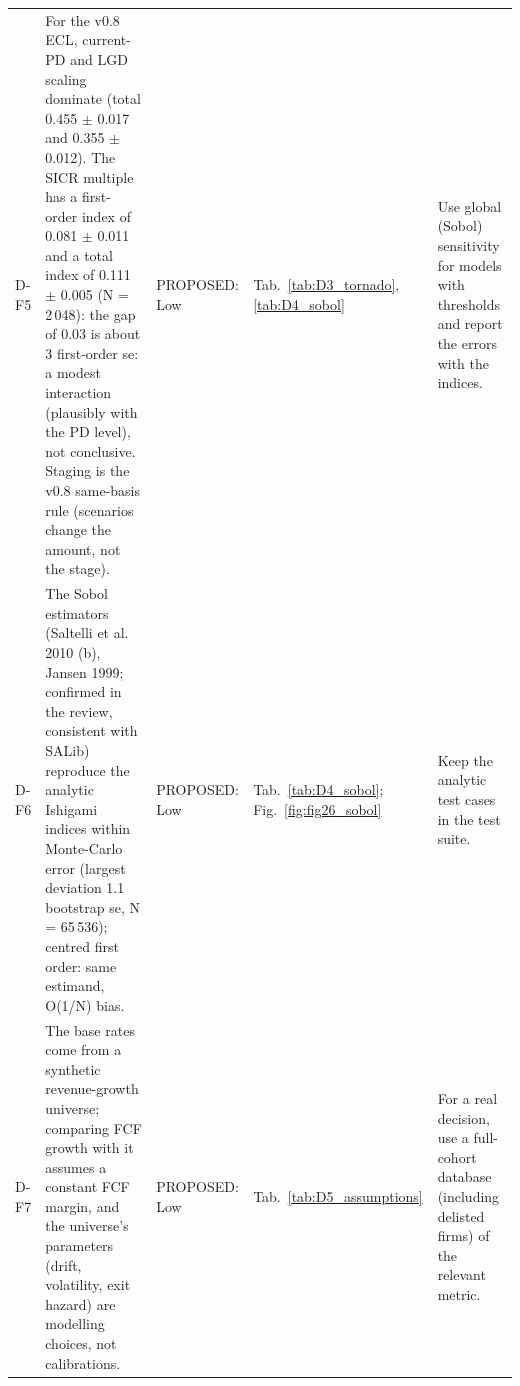 \begin{table}[H]
\begin{tabular}{>{\raggedright\arraybackslash}p{0.75cm}>{\raggedright\arraybackslash}p{6.6cm}>{\raggedright\arraybackslash}p{1.85cm}>{\raggedright\arraybackslash}p{2.4cm}>{\raggedright\arraybackslash}p{3.5cm}}
D-F5 & For the v0.8 ECL, current-PD and LGD scaling dominate (total 0.455 $\pm$ 0.017 and 0.355 $\pm$ 0.012). The SICR multiple has a first-order index of 0.081 $\pm$ 0.011 and a total index of 0.111 $\pm$ 0.005 (N = 2\,048): the gap of 0.03 is about 3 first-order se: a modest interaction (plausibly with the PD level), not conclusive. Staging is the v0.8 same-basis rule (scenarios change the amount, not the stage). & PROPOSED: Low & Tab.~\ref{tab:D3_tornado}, \ref{tab:D4_sobol} & Use global (Sobol) sensitivity for models with thresholds and report the errors with the indices. \\
D-F6 & The Sobol estimators (Saltelli et al. 2010 (b), Jansen 1999; confirmed in the review, consistent with SALib) reproduce the analytic Ishigami indices within Monte-Carlo error (largest deviation 1.1 bootstrap se, N = 65\,536); centred first order: same estimand, O(1/N) bias. & PROPOSED: Low & Tab.~\ref{tab:D4_sobol}; Fig.~\ref{fig:fig26_sobol} & Keep the analytic test cases in the test suite. \\
D-F7 & The base rates come from a synthetic revenue-growth universe; comparing FCF growth with it assumes a constant FCF margin, and the universe's parameters (drift, volatility, exit hazard) are modelling choices, not calibrations. & PROPOSED: Low & Tab.~\ref{tab:D5_assumptions} & For a real decision, use a full-cohort database (including delisted firms) of the relevant metric. \\
\bottomrule
\end{tabular}
\end{table}
